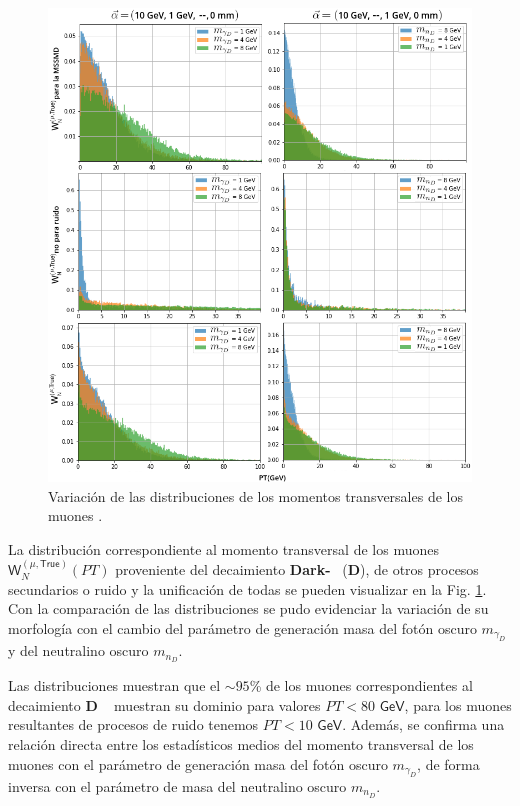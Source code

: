 \begin{figure}[!ht]
\centering
\includegraphics[width=.9\textwidth]{Simulacion/imagenes/True_PT4.png}
\caption{Variación de las distribuciones de los momentos transversales de los muones .}
\label{PT_mu_True}
\end{figure}

La distribución correspondiente al momento transversal de los muones $\textsf{W}^{(\mu,\textsf{True})}_N (PT)$ proveniente del decaimiento  \textbf{Dark-}\SUSY ~ (\MSSM\textbf{D}),
de otros procesos secundarios o ruido y la unificación de todas se pueden visualizar en la Fig. \ref{PT_mu_True}. Con la comparación de las distribuciones se pudo evidenciar la variación de su morfología con el cambio del parámetro de generación masa del fotón oscuro $m_{\gamma_D}$ y del neutralino oscuro $m_{n_D}$. 


Las distribuciones muestran que el $\sim 95$\% de los muones correspondientes al decaimiento \MSSM\textbf{D} ~ muestran su dominio para valores $PT < 80 \textsf{ GeV}$, para los muones resultantes de procesos de ruido tenemos $PT < 10 \textsf{ GeV}$. Además, se confirma una relación directa entre los estadísticos medios del momento transversal de los muones con el parámetro de generación masa del fotón oscuro $m_{\gamma_D}$, de forma inversa con el parámetro de masa del neutralino oscuro $m_{n_D}$.



